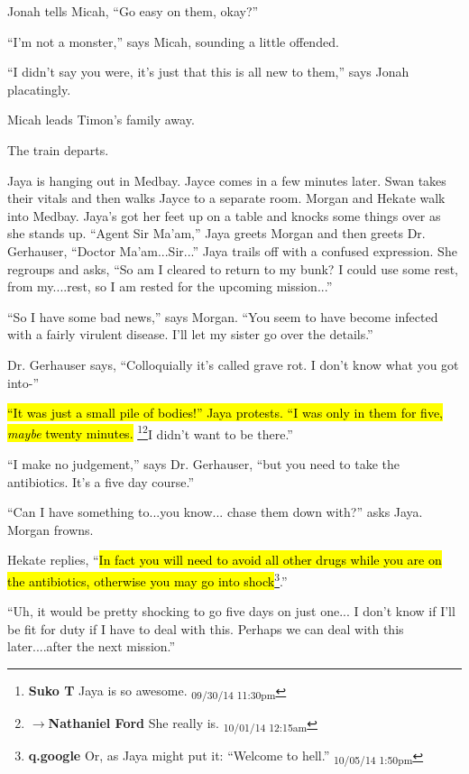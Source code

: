 Jonah tells Micah, ``Go easy on them, okay?''

``I'm not a monster,'' says Micah, sounding a little offended.

``I didn't say you were, it's just that this is all new to them,'' says Jonah placatingly.

Micah leads Timon's family away.

The train departs.





Jaya is hanging out in Medbay.  Jayce comes in a few minutes later.  Swan takes their vitals and then walks Jayce to a separate room.  Morgan and Hekate walk into Medbay.  Jaya's got her feet up on a table and knocks some things over as she stands up. ``Agent Sir Ma'am,'' Jaya greets Morgan and then greets Dr. Gerhauser, ``Doctor Ma'am...Sir...'' Jaya trails off with a confused expression.  She regroups and asks, ``So am I cleared to return to my bunk?  I could use some rest, from my....rest, so I am rested for the upcoming mission...''

``So I have some bad news,'' says Morgan.  ``You seem to have become infected with a fairly virulent disease.  I'll let my sister go over the details.''

Dr. Gerhauser says, ``Colloquially it's called grave rot.  I don't know what you got into-''

\hl{``It was just a small pile of bodies!'' Jaya protests.  ``I was only in them for five, \textit{maybe} twenty minutes.}  \footnote{\textbf{Suko T }Jaya is so awesome. \textsubscript{09/30/14 11:30pm}}\footnote{$\rightarrow$\textbf{Nathaniel Ford }She really is. \textsubscript{10/01/14 12:15am}}I didn't want to be there.''

``I make no judgement,'' says Dr. Gerhauser, ``but you need to take the antibiotics.  It's a five day course.''

``Can I have something to...you know... chase them down with?'' asks Jaya.  Morgan frowns.

Hekate replies, ``\hl{In fact you will need to avoid all other drugs while you are on the antibiotics, otherwise you may go into shock}\footnote{\textbf{q.google }Or, as Jaya might put it: ``Welcome to hell.'' \textsubscript{10/05/14 1:50pm}}.''

``Uh, it would be pretty shocking to go five days on just one... I don't know if I'll be fit for duty if I have to deal with this.  Perhaps we can deal with this later....after the next mission.''

